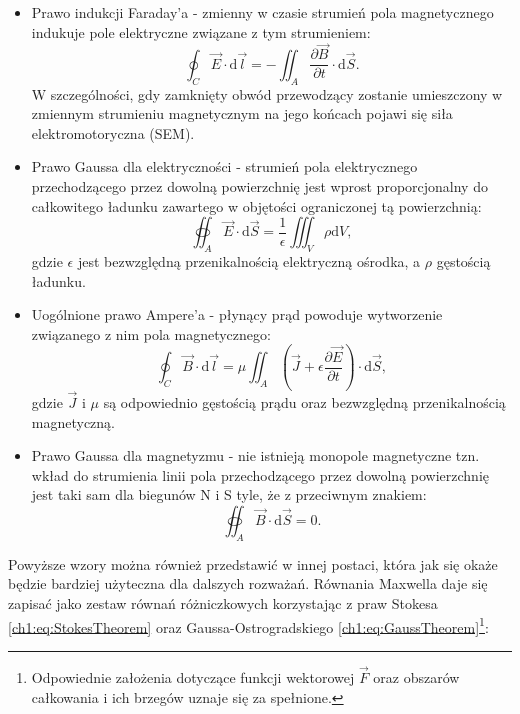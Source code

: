 \begin{itemize}
\item Prawo indukcji Faraday'a - zmienny w czasie strumień pola magnetycznego indukuje pole elektryczne związane z tym strumieniem:
\begin{equation}
\oint_C\vec{E}\cdot \mathrm{d}\vec{l} = -\iint_A\frac{\partial\vec{B}}{\partial t}\cdot \mathrm{d}\vec{S}.
\label{ch1:eq:Faraday}
\end{equation}
W szczególności, gdy zamknięty obwód przewodzący zostanie umieszczony w zmiennym strumieniu magnetycznym na jego końcach pojawi się siła elektromotoryczna (SEM).
\item Prawo Gaussa dla elektryczności - strumień pola elektrycznego przechodzącego przez dowolną powierzchnię jest wprost proporcjonalny do całkowitego ładunku zawartego w objętości ograniczonej tą powierzchnią:
\begin{equation}
\oiint_A \vec{E}\cdot\mathrm{d}\vec{S} = \frac{1}{\epsilon}\iiint_V\rho\mathrm{d}V,
\label{ch1:eq:Gauss}
\end{equation}
gdzie $\epsilon$ jest bezwzględną przenikalnością elektryczną ośrodka, a $\rho$ gęstością ładunku.
\item Uogólnione prawo Ampere'a - płynący prąd powoduje wytworzenie związanego z nim pola magnetycznego:
\begin{equation}
\oint_C\vec{B}\cdot\mathrm{d}\vec{l} = \mu\iint_A\left(\vec{J} + \epsilon\frac{\partial\vec{E}}{\partial t} \right)\cdot\mathrm{d}\vec{S}, 
\label{ch1:eq:Ampere}
\end{equation}
gdzie $\vec{J}$ i $\mu$ są odpowiednio gęstością prądu oraz bezwzględną przenikalnością magnetyczną.
\item Prawo Gaussa dla magnetyzmu - nie istnieją monopole magnetyczne tzn. wkład do strumienia linii pola przechodzącego przez dowolną powierzchnię jest taki sam dla biegunów N i S tyle, że z przeciwnym znakiem:
\begin{equation}
\oiint_A \vec{B}\cdot\mathrm{d}\vec{S} = 0.
\label{ch1:eq:GaussB}
\end{equation}
\end{itemize}
Powyższe wzory można również przedstawić w innej postaci, która jak się okaże będzie bardziej użyteczna dla dalszych rozważań. Równania Maxwella daje się zapisać jako zestaw równań różniczkowych korzystając z praw Stokesa \eqref{ch1:eq:StokesTheorem} oraz Gaussa-Ostrogradskiego \eqref{ch1:eq:GaussTheorem}\footnote{Odpowiednie założenia dotyczące funkcji wektorowej $\vec{F}$ oraz obszarów całkowania i ich brzegów uznaje się za spełnione.}:

